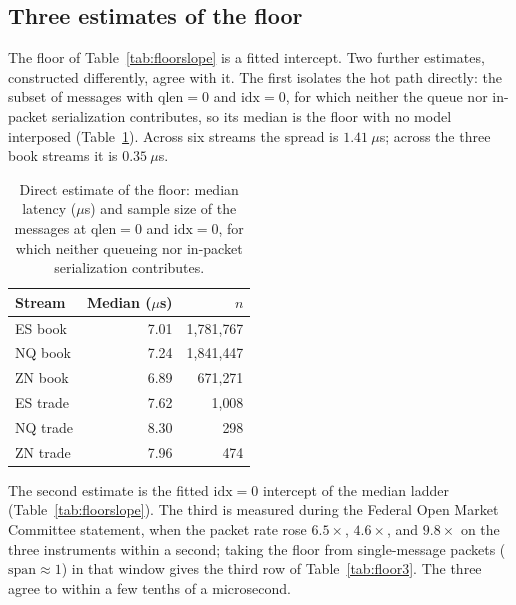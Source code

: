 \documentclass[11pt]{article}
\begin{document}
\subsection{Three estimates of the floor}
\label{sec:floor-robust}

The floor of Table~\ref{tab:floorslope} is a fitted intercept. Two further
estimates, constructed differently, agree with it. The first isolates the hot path
directly: the subset of messages with $\text{qlen}=0$ and $\text{idx}=0$, for which
neither the queue nor in-packet serialization contributes, so its median is the
floor with no model interposed (Table~\ref{tab:floordirect}). Across six streams
the spread is $1.41~\mu$s; across the three book streams it is $0.35~\mu$s.

\begin{table}[!htb]
\centering
\caption{Direct estimate of the floor: median latency ($\mu$s) and sample size
of the messages at $\text{qlen}=0$ and $\text{idx}=0$, for which neither
queueing nor in-packet serialization contributes.}
\label{tab:floordirect}
\small
\begin{tabular}{lrr}
\toprule
Stream & Median ($\mu$s) & $n$ \\
\midrule
ES book  & 7.01 & 1{,}781{,}767 \\
NQ book  & 7.24 & 1{,}841{,}447 \\
ZN book  & 6.89 & \phantom{0,}671{,}271 \\
ES trade & 7.62 & \phantom{0,00}1{,}008 \\
NQ trade & 8.30 & \phantom{0,000,}298 \\
ZN trade & 7.96 & \phantom{0,000,}474 \\
\bottomrule
\end{tabular}
\end{table}

The second estimate is the fitted $\text{idx}=0$ intercept of the median ladder
(Table~\ref{tab:floorslope}). The third is measured during the Federal Open Market
Committee statement, when the packet rate rose $6.5\times$, $4.6\times$, and
$9.8\times$ on the three instruments within a second; taking the floor from
single-message packets ($\text{span}\approx1$) in that window gives the third row
of Table~\ref{tab:floor3}. The three agree to within a few tenths of a
microsecond.
\end{document}
